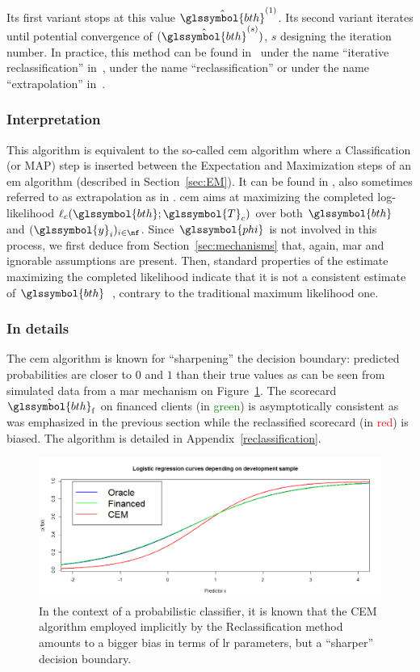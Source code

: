 Its first variant stops at this value $\hat{\glssymbol{bth}}^{(1)}$. Its second variant iterates until potential convergence of $(\hat{\glssymbol{bth}}^{(s)})$, $s$ designing the iteration number. In practice, this method can be found in~\cite{saporta} under the name ``iterative reclassification'' in~\cite{RI6}, under the name ``reclassification'' or under the name ``extrapolation'' in~\cite{banasik}.

\subsubsection{Interpretation}
This algorithm is equivalent to the so-called \gls{cem} algorithm where a Classification (or MAP) step is inserted between the Expectation and Maximization steps of an \gls{em} algorithm (described in Section~\ref{sec:EM}). It can be found in \cite{RI6}, also sometimes referred to as extrapolation as in \cite{banasik}. \gls{cem} aims at maximizing the completed log-likelihood $\ell_c(\glssymbol{bth};\glssymbol{T}_c)$ over both $\glssymbol{bth}$ and $(\glssymbol{y}_i)_{i \in \nf}$. Since $\glssymbol{phi}$ is not involved in this process, we first deduce from Section~\ref{sec:mechanisms} that, again, \gls{mar} and ignorable assumptions are present. Then, standard properties of the estimate maximizing the completed likelihood indicate that it is not a consistent estimate of $\glssymbol{bth}$~\cite{celeux1992classification}, contrary to the traditional maximum likelihood one.

\subsubsection{In details}
The \gls{cem} algorithm is known for ``sharpening'' the decision boundary: predicted probabilities are closer to $0$ and $1$ than their true values as can be seen from simulated data from a \gls{mar} mechanism on Figure~\ref{fig:biais_CEM}. The scorecard $\hat{\glssymbol{bth}}_{\text{f}}$ on financed clients (in \textcolor{green}{green}) is asymptotically consistent as was emphasized in the previous section while the reclassified scorecard (in \textcolor{red}{red}) is biased. The algorithm is detailed in Appendix~\ref{reclassification}.

\begin{figure}[ht]
\center \includegraphics[width=\textwidth]{figures/chapitre2/CEM_bias.png}
\caption{In the context of a probabilistic classifier, it is known that the CEM algorithm employed implicitly by the Reclassification method amounts to a bigger bias in terms of \gls{lr} parameters, but a ``sharper'' decision boundary.}
\label{fig:biais_CEM}
\end{figure}


